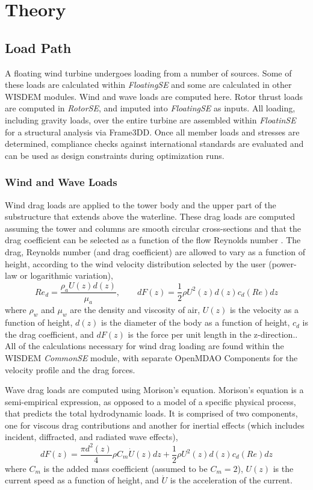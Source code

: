 
\section{Theory}
\label{sec:theory}
\subsection{Load Path}
A floating wind turbine undergoes loading from a number of sources.
Some of these loads are calculated within \textit{FloatingSE} and some are
calculated in other WISDEM modules.  Wind and wave loads are computed
here.  Rotor thrust loads are computed in \textit{RotorSE}, and imputed into
\textit{FloatingSE} as inputs.  All loading, including gravity loads, over the
entire turbine are assembled within \textit{FloatinSE} for a structural analysis
via Frame3DD.  Once all member loads and stresses are determined,
compliance checks against international standards are evaluated and can
be used as design constraints during optimization runs.

\subsubsection{Wind and Wave Loads}
Wind drag loads are applied to the tower body and the upper part of the
substructure that extends above the waterline.  These drag loads are
computed assuming the tower and columns are smooth circular
cross-sections and that the drag coefficient can be selected as a
function of the flow Reynolds number \citep{Roshko}.  The drag, Reynolds
number (and drag coefficient) are allowed to vary as a function of
height, according to the wind velocity distribution selected by the user
(power-law or logarithmic variation),
\[
Re_d = \frac{\rho_a U(z) d(z)}{\mu_a},\qquad dF(z) = \frac{1}{2} \rho U^2(z)
d(z) c_d(Re) dz
\]
where $\rho_w$ and $\mu_w$ are the density and viscosity of air, $U(z)$
is the velocity as a function of height, $d(z)$ is the diameter of the
body as a function of height, $c_d$ is the drag coefficient, and $dF(z)$
is the force per unit length in the z-direction.. All of the
calculations necessary for wind drag loading are found within the WISDEM
\textit{CommonSE} module, with separate OpenMDAO Components for the velocity
profile and the drag forces.

Wave drag loads are computed using Morison's equation.  Morison's
equation is a semi-empirical expression, as opposed to a
model of a specific physical process, that predicts the total
hydrodynamic loads.  It is comprised of two components, one for viscous
drag contributions and another for inertial effects (which includes incident,
diffracted, and radiated wave effects),
\begin{equation} \label{eqn:morison}
  dF(z) = \frac{\pi d^2(z)}{4} \rho C_m \dot{U}(z)dz + \frac{1}{2} \rho U^2(z) d(z) c_d(Re)dz
\end{equation}
where $C_m$ is the added mass coefficient (assumed to be $C_m=2$),
$U(z)$ is the current speed as a function of height, and
$\dot{U}$ is the acceleration of the current.

